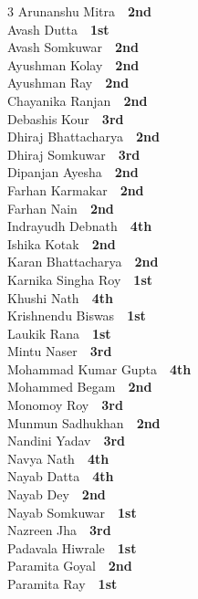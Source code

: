 \documentclass[11pt,a4paper]{article}
\begin{document}
\begin{multicols}{3}
Arunanshu Mitra~\dotfill~\textbf{2nd}\\
Avash Dutta~\dotfill~\textbf{1st}\\
Avash Somkuwar~\dotfill~\textbf{2nd}\\
Ayushman Kolay~\dotfill~\textbf{2nd}\\
Ayushman Ray~\dotfill~\textbf{2nd}\\
Chayanika Ranjan~\dotfill~\textbf{2nd}\\
Debashis Kour~\dotfill~\textbf{3rd}\\
Dhiraj Bhattacharya~\dotfill~\textbf{2nd}\\
Dhiraj Somkuwar~\dotfill~\textbf{3rd}\\
Dipanjan Ayesha~\dotfill~\textbf{2nd}\\
Farhan Karmakar~\dotfill~\textbf{2nd}\\
Farhan Nain~\dotfill~\textbf{2nd}\\
Indrayudh Debnath~\dotfill~\textbf{4th}\\
Ishika Kotak~\dotfill~\textbf{2nd}\\
Karan Bhattacharya~\dotfill~\textbf{2nd}\\
Karnika Singha Roy~\dotfill~\textbf{1st}\\
Khushi Nath~\dotfill~\textbf{4th}\\
Krishnendu Biswas~\dotfill~\textbf{1st}\\
Laukik Rana~\dotfill~\textbf{1st}\\
Mintu Naser~\dotfill~\textbf{3rd}\\
Mohammad Kumar Gupta~\dotfill~\textbf{4th}\\
Mohammed Begam~\dotfill~\textbf{2nd}\\
Monomoy Roy~\dotfill~\textbf{3rd}\\
Munmun Sadhukhan~\dotfill~\textbf{2nd}\\
Nandini Yadav~\dotfill~\textbf{3rd}\\
Navya Nath~\dotfill~\textbf{4th}\\
Nayab Datta~\dotfill~\textbf{4th}\\
Nayab Dey~\dotfill~\textbf{2nd}\\
Nayab Somkuwar~\dotfill~\textbf{1st}\\
Nazreen Jha~\dotfill~\textbf{3rd}\\
Padavala Hiwrale~\dotfill~\textbf{1st}\\
Paramita Goyal~\dotfill~\textbf{2nd}\\
Paramita Ray~\dotfill~\textbf{1st}\\

\end{multicols}
\end{document}
